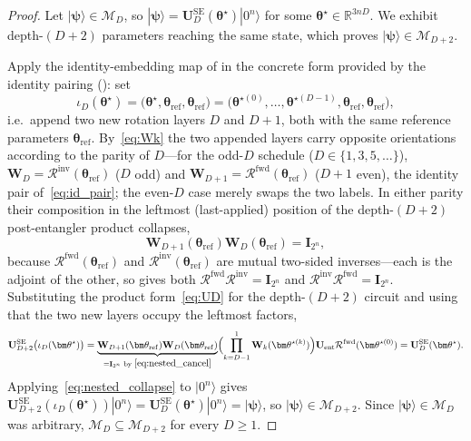 \documentclass[11pt]{article}
\newcommand{\cM}{\mathcal{M}}
\newcommand{\bbR}{\mathbb{R}}
\theoremstyle{plain}
\theoremstyle{plain}
\begin{document}
\begin{proof}
Let $|\boldsymbol{\psi}\rangle\in\cM_D$, so
$|\boldsymbol{\psi}\rangle=\mathbf{U}_D^{\mathrm{SE}}(\bm\theta^\star)|0^n\rangle$ for
some $\bm\theta^\star\in\bbR^{3nD}$. We exhibit depth-$(D{+}2)$
parameters reaching the same state, which proves
$|\boldsymbol{\psi}\rangle\in\cM_{D+2}$.

Apply the identity-embedding map of  in the concrete form
provided by the identity pairing (): set
\begin{equation}\label{eq:nested_iota}
  \iota_D(\bm\theta^\star)
  = \bigl(\bm\theta^\star, \bm\theta_{\mathrm{ref}}, 
          \bm\theta_{\mathrm{ref}}\bigr)
  = \bigl(\bm\theta^{\star(0)},\dots,\bm\theta^{\star(D-1)}, 
          \bm\theta_{\mathrm{ref}}, \bm\theta_{\mathrm{ref}}\bigr),
\end{equation}
i.e.\ append two new rotation layers $D$ and $D{+}1$, both with the same
reference parameters $\bm\theta_{\mathrm{ref}}$.  By~\eqref{eq:Wk} the two
appended layers carry opposite orientations according to the parity of
$D$---for the odd-$D$ schedule ($D\in\{1,3,5,\dots\}$), $\mathbf{W}_D
=\mathcal{R}^{\mathrm{inv}}(\bm\theta_{\mathrm{ref}})$ ($D$ odd) and
$\mathbf{W}_{D+1}=\mathcal{R}^{\mathrm{fwd}}(\bm\theta_{\mathrm{ref}})$
($D{+}1$ even), the identity pair of~\eqref{eq:id_pair}; the even-$D$
case merely swaps the two labels.  In either parity their composition in
the leftmost (last-applied) position of the depth-$(D{+}2)$
post-entangler product collapses,
\begin{equation}\label{eq:nested_cancel}
  \mathbf{W}_{D+1}(\bm\theta_{\mathrm{ref}}) 
  \mathbf{W}_D(\bm\theta_{\mathrm{ref}})
  = \mathbf{I}_{2^n},
\end{equation}
because $\mathcal{R}^{\mathrm{fwd}}(\bm\theta_{\mathrm{ref}})$ and
$\mathcal{R}^{\mathrm{inv}}(\bm\theta_{\mathrm{ref}})$ are mutual
two-sided inverses---each is the adjoint of the other, so
 gives both
$\mathcal{R}^{\mathrm{fwd}}\mathcal{R}^{\mathrm{inv}}=\mathbf{I}_{2^n}$ and
$\mathcal{R}^{\mathrm{inv}}\mathcal{R}^{\mathrm{fwd}}=\mathbf{I}_{2^n}$. Substituting the
product form~\eqref{eq:UD} for the depth-$(D{+}2)$ circuit and using
that the two new layers occupy the leftmost factors,
\begin{equation}\label{eq:nested_collapse}
  \mathbf{U}_{D+2}^{\mathrm{SE}}\bigl(\iota_D(\bm\theta^\star)\bigr)
  = \underbrace{\mathbf{W}_{D+1}(\bm\theta_{\mathrm{ref}}) 
      \mathbf{W}_D(\bm\theta_{\mathrm{ref}})}_{= \mathbf{I}_{2^n}
      \text{ by }\eqref{eq:nested_cancel}}
     \Bigl(\prod_{k=D-1}^{1}\mathbf{W}_k(\bm\theta^{\star(k)})\Bigr)
    \mathbf{U}_{\mathrm{ent}} 
    \mathcal{R}^{\mathrm{fwd}}(\bm\theta^{\star(0)})
  = \mathbf{U}_D^{\mathrm{SE}}(\bm\theta^\star).
\end{equation}
Applying~\eqref{eq:nested_collapse} to $|0^n\rangle$ gives
$\mathbf{U}_{D+2}^{\mathrm{SE}}(\iota_D(\bm\theta^\star))|0^n\rangle
=\mathbf{U}_D^{\mathrm{SE}}(\bm\theta^\star)|0^n\rangle=|\boldsymbol{\psi}\rangle$,
so $|\boldsymbol{\psi}\rangle\in\cM_{D+2}$. Since $|\boldsymbol{\psi}\rangle\in\cM_D$
was arbitrary, $\cM_D\subseteq\cM_{D+2}$ for every $D\ge 1$.
\end{proof}
\end{document}
